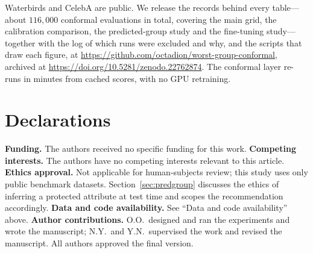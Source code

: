 \documentclass[pdflatex,sn-basic]{sn-jnl}%
\theoremstyle{thmstyleone}%
\begin{document}
\backmatter
{}
Waterbirds and CelebA are public. We release the records behind every table---about
$116{,}000$ conformal evaluations in total, covering the main grid, the calibration
comparison, the predicted-group study and the fine-tuning study---together with the
log of which runs were excluded and why, and the scripts that draw each figure, at
\url{https://github.com/octadion/worst-group-conformal}, archived at
\url{https://doi.org/10.5281/zenodo.22762874}. The conformal layer re-runs in
minutes from cached scores, with no GPU retraining.

\section*{Declarations}
\textbf{Funding.} The authors received no specific funding for this work.
\textbf{Competing interests.} The authors have no competing interests relevant to
this article. \textbf{Ethics approval.} Not applicable for human-subjects review; this study uses only public benchmark datasets. Section~\ref{sec:predgroup} discusses the ethics of inferring a protected attribute at test time and scopes the recommendation accordingly. \textbf{Data and
code availability.} See ``Data and code availability'' above. \textbf{Author
contributions.} O.O.\ designed and ran the experiments and wrote the manuscript;
N.Y.\ and Y.N.\ supervised the work and revised the manuscript. All authors approved
the final version.
\end{document}
